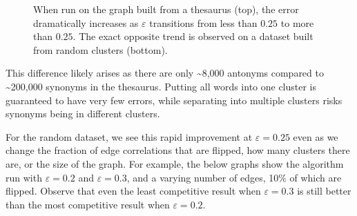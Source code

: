 \documentclass[
]{article}
\begin{document}
\begin{figure}[!htb]
  \caption{\label{fig:opposite-trends}
    When run on the graph built from a thesaurus (top), the error dramatically increases
    as $\varepsilon$ transitions from less than $0.25$ to more than $0.25$. The exact
    opposite trend is observed on a dataset built from random clusters (bottom).}
\end{figure}
This difference likely arises as there are only \textasciitilde8,000
antonyms compared to \textasciitilde200,000 synonyms in the thesaurus.
Putting all words into one cluster is guaranteed to have very few
errors, while separating into multiple clusters risks synonyms being in
different clusters.

For the random dataset, we see this rapid improvement at
  {\(\varepsilon = 0.25\)} even as we change the fraction of edge
correlations that are flipped, how many clusters there are, or the size
of the graph. For example, the below graphs show the algorithm run with
  {\(\varepsilon = 0.2\)} and {\(\varepsilon = 0.3\)}, and a varying
number of edges, 10\% of which are flipped. Observe that even the least
competitive result when $\varepsilon = 0.3$ is still better than the most
competitive result when $\varepsilon = 0.2$.
\end{document}
